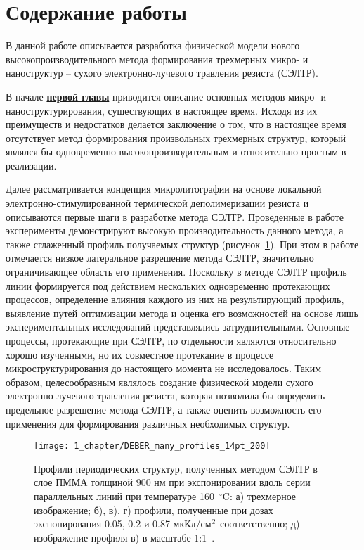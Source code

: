 \chapter*{Содержание работы}
В данной работе описывается разработка физической модели нового высокопроизводительного метода формирования трехмерных микро- и наноструктур -- сухого электронно-лучевого травления резиста (СЭЛТР). 

В начале \underline{\textbf{первой главы}} приводится описание основных методов микро- и наноструктурирования, существующих в настоящее время. Исходя из их преимуществ и недостатков делается заключение о том, что в настоящее время отсутствует метод формирования произвольных трехмерных структур, который являлся бы одновременно высокопроизводительным и относительно простым в реализации.

Далее рассматривается концепция микролитографии на основе локальной электронно-стимулированной термической деполимеризации резиста и описываются первые шаги в разработке метода СЭЛТР.
Проведенные в работе~\cite{Bruk_2016_mee} эксперименты демонстрируют высокую производительность данного метода, а также сглаженный профиль получаемых структур (рисунок~\ref{fig:DEBER_many_profiles}).
При этом в работе отмечается низкое латеральное разрешение метода СЭЛТР, значительно ограничивающее область его применения.
Поскольку в методе СЭЛТР профиль линии формируется под действием нескольких одновременно протекающих процессов, определение влияния каждого из них на результирующий профиль, выявление путей оптимизации метода и оценка его возможностей на основе лишь экспериментальных исследований представлялись затруднительными.
Основные процессы, протекающие при СЭЛТР, по отдельности являются относительно хорошо изученными, но их совместное протекание в процессе микроструктурирования до настоящего момента не исследовалось.
Таким образом, целесообразным являлось создание физической модели сухого электронно-лучевого травления резиста, которая позволила бы определить предельное разрешение метода СЭЛТР, а также оценить возможность его применения для формирования различных необходимых структур.
\begin{figure}
	\centering
	\texttt{[image: 1\_chapter/DEBER\_many\_profiles\_14pt\_200]}
	\vspace{0.2em}
	\caption{Профили периодических структур, полученных методом СЭЛТР в слое ПММА толщиной 900 нм при экспонировании вдоль серии параллельных линий при температуре 160~$^\circ$C: а) трехмерное изображение; б), в), г) профили, полученные при дозах экспонирования 0.05, 0.2 и 0.87 мкКл/см$^\text{2}$ соответственно; д) изображение профиля в) в масштабе 1:1~\cite{Bruk_2016_mee}.}
	\label{fig:DEBER_many_profiles}
\end{figure}

